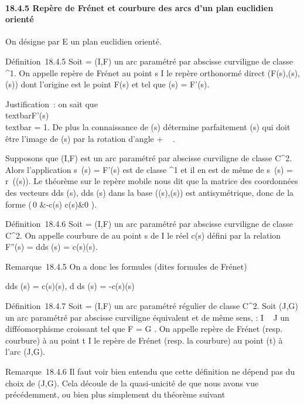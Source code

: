 \paragraph{18.4.5 Repère de Frénet et courbure des arcs d'un plan
euclidien orienté}

On désigne par E un plan euclidien orienté.

Définition~18.4.5 Soit \Gamma = (I,F) un arc paramétré par abscisse
curviligne de classe ^1. On appelle repère de Frénet au
point s \in I le repère orthonormé direct
(F(s),\vect(s),\vecn(s)) dont
l'origine est le point F(s) et tel que \vect(s) =
F'(s).

Justification~: on sait que
\\textbar{}F'(s)\\textbar{} = 1. De plus
la connaissance de \vect(s) détermine parfaitement
\vecn(s) qui doit être l'image de
\vect(s) par la rotation d'angle + \pi~
 .

Supposons que (I,F) est un arc paramétré par abscisse curviligne de
classe C^2. Alors l'application
s\mapsto~\vect(s) = F'(s) est de
classe ^1 et il en est de même de
s\mapsto~\vecn(s) =
r\pi~(\vect(s)). Le théorème sur le repère
mobile nous dit que la matrice des coordonnées des vecteurs 
d\vect \over ds (s),
d\vecn \over ds (s) dans la base
(\vect(s),\vecn(s)) est
antisymétrique, donc de la forme \left
(\matrix\,0 &-c(s) \cr
c(s)&0 \right ).

Définition~18.4.6 Soit \Gamma = (I,F) un arc paramétré par abscisse
curviligne de classe C^2. On appelle courbure de \Gamma au point s
de I le réel c(s) défini par la relation F''(s) =
d\vect \over ds (s) =
c(s)\vecn(s).

Remarque~18.4.5 On a donc les formules (dites formules de Frénet)

 d\vect \over ds (s) =
c(s)\vecn(s), d\vecn
\over ds (s) = -c(s)\vect(s)

Définition~18.4.7 Soit \Gamma = (I,F) un arc paramétré régulier de classe
C^2. Soit (J,G) un arc paramétré par abscisse curviligne
équivalent et de même sens, \theta : I \rightarrow~ J un difféomorphisme croissant tel
que F = G \cdot \theta. On appelle repère de Frénet (resp. courbure) à \Gamma au point
t \in I le repère de Frénet (resp. la courbure) au point \theta(t) à l'arc
(J,G).

Remarque~18.4.6 Il faut voir bien entendu que cette définition ne dépend
pas du choix de (J,G). Cela découle de la quasi-unicité de \theta que nous
avons vue précédemment, ou bien plus simplement du théorème suivant

